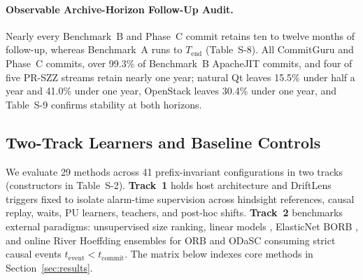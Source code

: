 \documentclass[pdflatex,sn-basic]{sn-jnl}
\theoremstyle{definition}
\theoremstyle{plain}
\begin{document}
\paragraph{Observable Archive-Horizon Follow-Up Audit.}
Nearly every Benchmark~B and Phase~C commit retains ten to twelve months of follow-up, whereas Benchmark~A runs to $T_{\text{end}}$ (Table~S-8). All CommitGuru and Phase~C commits, over 99.3\% of Benchmark~B ApacheJIT commits, and four of five PR-SZZ streams retain nearly one year; natural Qt leaves 15.5\% under half a year and 41.0\% under one year, OpenStack leaves 30.4\% under one year, and Table~S-9 confirms stability at both horizons.

\subsection{Two-Track Learners and Baseline Controls}
\label{sec:baselines}

We evaluate 29 methods across 41 prefix-invariant configurations in two tracks (constructors in Table~S-2). \textbf{Track~1} holds host architecture and DriftLens triggers fixed to isolate alarm-time supervision across hindsight references, causal replay, waits, PU learners, teachers, and post-hoc shifts. \textbf{Track~2} benchmarks external paradigms: unsupervised size ranking, linear models \citep{zeng2021deep}, ElasticNet BORB \citep{cabral2023borb}, and online River Hoeffding ensembles for ORB \citep{cabral2019class} and ODaSC \citep{song2022odasc} consuming strict causal events $t_{\text{event}} < t_{\text{commit}}$. The matrix below indexes core methods in Section~\ref{sec:results}.
\end{document}
